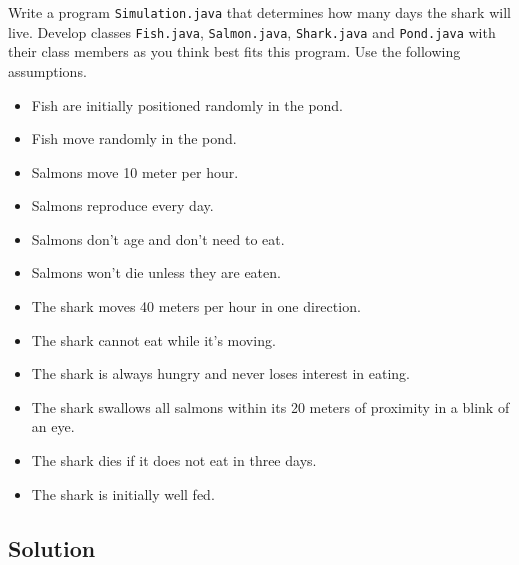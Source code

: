 Write a program \texttt{Simulation.java} that determines how many days the shark will live. Develop classes \texttt{Fish.java}, \texttt{Salmon.java}, \texttt{Shark.java} and \texttt{Pond.java} with their class members as you think best fits this program. Use the following assumptions.
\begin{itemize}[itemsep=1mm] \parskip=0pt \parsep=0pt
\item[] Fish are initially positioned randomly in the pond.
\item[] Fish move randomly in the pond.
\item[] Salmons move 10 meter per hour.
\item[] Salmons reproduce every day.
\item[] Salmons don't age and don't need to eat.
\item[] Salmons won't die unless they are eaten.
\item[] The shark moves 40 meters per hour in one direction.
\item[] The shark cannot eat while it's moving.
\item[] The shark is always hungry and never loses interest in eating.
\item[] The shark swallows all salmons within its 20 meters of proximity in a blink of an eye.
\item[] The shark dies if it does not eat in three days.
\item[] The shark is initially well fed.
\end{itemize}

\subsection*{Solution}

